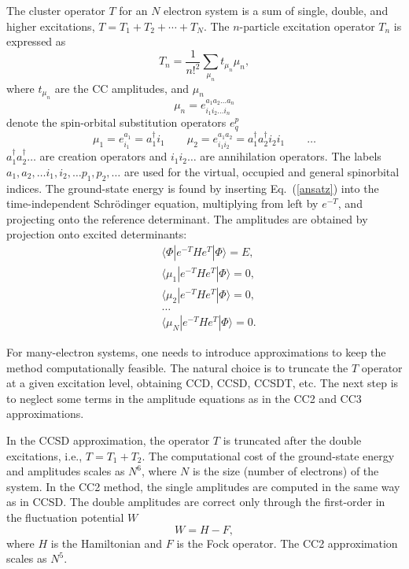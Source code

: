 \documentclass[preprint,12pt]{elsarticle}
\newcommand{\equ}[1]{\begin{equation} #1 \end{equation}}
\newcommand{\equl}[2]{\begin{equation}\label{#2} #1 \end{equation}}
\newcommand{\equa}[1]{\begin{align} #1 \end{align}}
\newcommand{\fr}[1]{Eq.~(\ref{#1})}
\newcommand{\rag}{\rangle}
\newcommand{\lag}{\langle}
\begin{document}
The cluster operator $T$ for an $N$ electron system is a sum of single, double, and higher excitations, $T=T_1+T_2+\cdots + T_{N}$. 
The $n$-particle excitation operator  $T_n$ is expressed as
\equ{
T_n = \frac{1}{n!^2}\sum_{\mu_n} t_{\mu_n} \mu_n,
}
where $t_{\mu_n}$ are the CC amplitudes, and $\mu_n$
\equ{
  \mu_n = e^{a_1a_2\ldots a_n}_{i_1i_2\ldots i_n}
}
denote the spin-orbital substitution operators $e^{p}_{q}$
\equ{
  \mu_1 = e^{a_1}_{i_1} = a_1^\dagger i_1 \qquad  \mu_2 = e^{a_1a_2}_{i_1i_2} = a_1^\dagger a_2^\dagger i_2 i_1 \qquad \ldots
}
$a_1^\dagger a_2^\dagger\ldots$ are  creation operators and $i_1i_2\ldots$ are annihilation operators.
The labels $a_1, a_2, \ldots i_1, i_2, \ldots p_1, p_2, \ldots$ are used
for the virtual, occupied and general spinorbital indices.
The ground-state energy is found by inserting \fr{ansatz} into the time-independent Schr\"{o}dinger equation, multiplying
 from left by $e^{-T}$, and projecting onto  the reference determinant. The amplitudes are obtained 
by projection onto excited determinants:
\equa{
&\lag \Phi|e^{-T}H e^{T}|\Phi\rag = E,\\
&\lag \mu_1|e^{-T}H e^{T}|\Phi\rag = 0,\nonumber\\
&\lag \mu_2|e^{-T}H e^{T}|\Phi\rag = 0,\nonumber\\
&\ldots\nonumber\\
&\lag \mu_N|e^{-T}H e^{T}|\Phi\rag = 0.\nonumber
}


For many-electron systems, one needs to introduce approximations to keep the method computationally feasible. The natural choice is to truncate
the $T$ operator at a given excitation level, obtaining  CCD\cite{vcivzek1966correlation}, CCSD\cite{purvis1982full, scuseria1988efficient, scuseria1987closed}, CCSDT,\cite{noga1987j, noga1988erratum, scuseria1988new}
etc. The next step is to neglect some terms in the amplitude
equations as in the  CC2\cite{christiansen1995second} and  CC3\cite{koch1997cc3} approximations. 


In the  CCSD approximation, the  operator $T$ is truncated after the double excitations, i.e., $T = T_1 + T_2$.
The computational cost of the ground-state energy and amplitudes scales
as $N^6$, where $N$ is the size (number of electrons) of the system. 
In the  CC2\cite{christiansen1995second} method, the single amplitudes are computed in the same way as in CCSD.
 The double amplitudes are correct only through the first-order in the fluctuation potential  $W$
\equl{ W = H - F, 
}{www}
where $H$ is the Hamiltonian and $F$ is the Fock operator.
The CC2 approximation scales as $N^5$.
\end{document}
